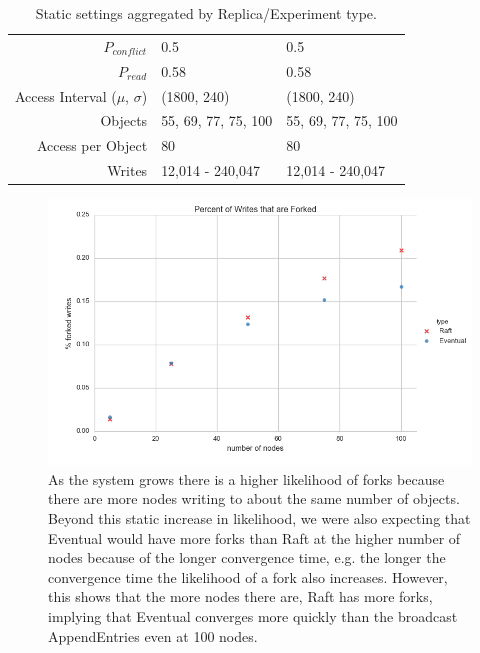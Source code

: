 \documentclass[11pt,letterpaper]{article}
\begin{document}
\begin{table}[!h]
{\begin{tabular}{|r|ll|}
$P_{conflict}$       & 0.5                       & 0.5                       \\
$P_{read}$           & 0.58                      & 0.58                      \\
Access Interval ($\mu$, $\sigma$) & (1800, 240)  & (1800, 240)               \\
Objects              & 55, 69, 77, 75, 100       & 55, 69, 77, 75, 100       \\
Access per Object    & 80                        & 80                        \\
Writes               & 12,014 - 240,047          & 12,014 - 240,047          \\
\hline
\end{tabular}}
\caption{\textsf{Static settings aggregated by Replica/Experiment type.}}
\label{table:settings}
\end{table}

\begin{figure}[!h]
    \centering
        \includegraphics[width=\textwidth]{figures/forked_writes.png}
        \caption{\textsf{As the system grows there is a higher likelihood of forks because there are more nodes writing to about the same number of objects. Beyond this static increase in likelihood, we were also expecting that Eventual would have more forks than Raft at the higher number of nodes because of the longer convergence time, e.g. the longer the convergence time the likelihood of a fork also increases. However, this shows that the more nodes there are, Raft has more forks, implying that Eventual converges more quickly than the broadcast AppendEntries even at 100 nodes.}}
        \label{fig:forked_writes}
\end{figure}
\end{document}
